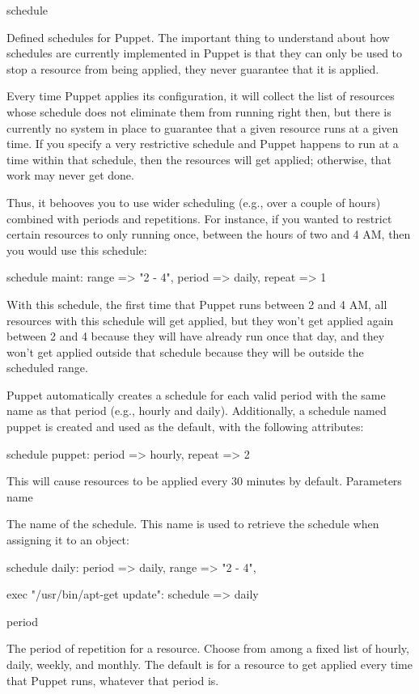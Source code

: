 schedule

Defined schedules for Puppet. The important thing to understand about how schedules are currently implemented in Puppet is that they can only be used to stop a resource from being applied, they never guarantee that it is applied.

Every time Puppet applies its configuration, it will collect the list of resources whose schedule does not eliminate them from running right then, but there is currently no system in place to guarantee that a given resource runs at a given time. If you specify a very restrictive schedule and Puppet happens to run at a time within that schedule, then the resources will get applied; otherwise, that work may never get done.

Thus, it behooves you to use wider scheduling (e.g., over a couple of hours) combined with periods and repetitions. For instance, if you wanted to restrict certain resources to only running once, between the hours of two and 4 AM, then you would use this schedule:

schedule { maint:
  range => "2 - 4",
  period => daily,
  repeat => 1
}

With this schedule, the first time that Puppet runs between 2 and 4 AM, all resources with this schedule will get applied, but they won’t get applied again between 2 and 4 because they will have already run once that day, and they won’t get applied outside that schedule because they will be outside the scheduled range.

Puppet automatically creates a schedule for each valid period with the same name as that period (e.g., hourly and daily). Additionally, a schedule named puppet is created and used as the default, with the following attributes:

schedule { puppet:
  period => hourly,
  repeat => 2
}

This will cause resources to be applied every 30 minutes by default.
Parameters
name

The name of the schedule. This name is used to retrieve the schedule when assigning it to an object:

schedule { daily:
  period => daily,
  range => "2 - 4",
}
  
exec { "/usr/bin/apt-get update":
  schedule => daily
}

period

The period of repetition for a resource. Choose from among a fixed list of hourly, daily, weekly, and monthly. The default is for a resource to get applied every time that Puppet runs, whatever that period is.

